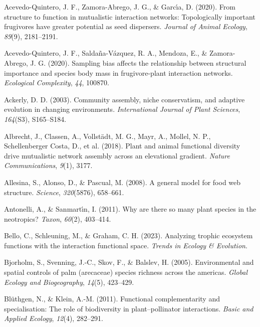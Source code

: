 \documentclass[
]{agujournal2019}
\newlength{\cslhangindent}
\newenvironment{CSLReferences}[2] %
 {\begin{list}{}{%
  \setlength{\itemindent}{0pt}
  \setlength{\leftmargin}{0pt}
  \setlength{\parsep}{0pt}
  \ifodd #1
   \setlength{\leftmargin}{\cslhangindent}
   \setlength{\itemindent}{-1\cslhangindent}
  \fi
  \setlength{\itemsep}{#2\baselineskip}}}
 {\end{list}}
\begin{document}
\label{refs}
\begin{CSLReferences}{1}{0}
\vspace{1em}

Acevedo-Quintero, J. F., Zamora-Abrego, J. G., \& Garcı́a, D. (2020).
From structure to function in mutualistic interaction networks:
Topologically important frugivores have greater potential as seed
dispersers. \emph{Journal of Animal Ecology}, \emph{89}(9), 2181--2191.

Acevedo-Quintero, J. F., Saldaña-Vázquez, R. A., Mendoza, E., \&
Zamora-Abrego, J. G. (2020). Sampling bias affects the relationship
between structural importance and species body mass in frugivore-plant
interaction networks. \emph{Ecological Complexity}, \emph{44}, 100870.

Ackerly, D. D. (2003). Community assembly, niche conservatism, and
adaptive evolution in changing environments. \emph{International Journal
of Plant Sciences}, \emph{164}(S3), S165--S184.

Albrecht, J., Classen, A., Vollstädt, M. G., Mayr, A., Mollel, N. P.,
Schellenberger Costa, D., et al. (2018). Plant and animal functional
diversity drive mutualistic network assembly across an elevational
gradient. \emph{Nature Communications}, \emph{9}(1), 3177.

Allesina, S., Alonso, D., \& Pascual, M. (2008). A general model for
food web structure. \emph{Science}, \emph{320}(5876), 658--661.

Antonelli, A., \& Sanmartı́n, I. (2011). Why are there so many plant
species in the neotropics? \emph{Taxon}, \emph{60}(2), 403--414.

Bello, C., Schleuning, M., \& Graham, C. H. (2023). Analyzing trophic
ecosystem functions with the interaction functional space. \emph{Trends
in Ecology \& Evolution}.

Bjorholm, S., Svenning, J.-C., Skov, F., \& Balslev, H. (2005).
Environmental and spatial controls of palm (arecaceae) species richness
across the americas. \emph{Global Ecology and Biogeography},
\emph{14}(5), 423--429.

Blüthgen, N., \& Klein, A.-M. (2011). Functional complementarity and
specialisation: The role of biodiversity in plant--pollinator
interactions. \emph{Basic and Applied Ecology}, \emph{12}(4), 282--291.


\end{CSLReferences}
\end{document}
